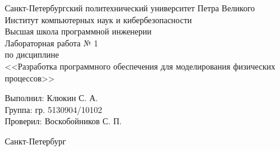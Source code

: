 \begin{titlepage}	%

	\begin{center}		%

		\large Санкт-Петербургский политехнический университет Петра Великого\\
		\large Институт компьютерных наук и кибербезопасности\\
		\large Высшая школа программной инженерии \\[6cm]

    \huge Лабораторная работа № 1\\[0.5cm] %
		\large по дисциплине\\[0.1cm]
		\large <<Разработка программного обеспечения для моделирования физических процессов>>

	\end{center}

		\noindent\large Выполнил: \hfill \large Клюкин С. А.\\
		\noindent\large Группа: \hfill \large гр. 5130904/10102\\

		\noindent\large Проверил: \hfill \large Воскобойников С. П.

	\vfill %

	\begin{center}
	\large Санкт-Петербург\\
	\large \the\year %
	\end{center} %

\end{titlepage} %

\vfill %
